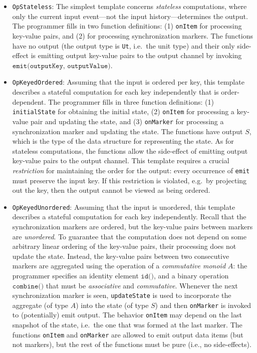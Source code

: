 \begin{itemize}
\item \texttt{OpStateless}:
The simplest template concerns \emph{stateless} computations, where only the current input event---not the input history---determines the output. The programmer fills in two function definitions: (1) \texttt{onItem} for processing key-value pairs, and (2)  for processing synchronization markers. The functions have no output (the output type is \texttt{Ut}, i.e.\ the unit type) and their only side-effect is emitting output key-value pairs to the output channel by invoking $\texttt{emit(outputKey, outputValue)}$.

\item \texttt{OpKeyedOrdered}:
Assuming that the input is ordered per key, this template describes a stateful computation for each key independently that is order-dependent. The programmer fills in three function definitions: (1) \texttt{initialState} for obtaining the initial state, (2) \texttt{onItem} for processing a key-value pair and updating the state, and (3) \texttt{onMarker} for processing a synchronization marker and updating the state. The functions have output $S$, which is the type of the data structure for representing the state. As for stateless computations, the functions allow the side-effect of emitting output key-value pairs to the output channel. This template requires a crucial \emph{restriction} for maintaining the order for the output: every occurrence of \texttt{emit} must preserve the input key. If this restriction is violated, e.g.\ by projecting out the key, then the output cannot be viewed as being ordered.

\item \texttt{OpKeyedUnordered}:
Assuming that the input is unordered, this template describes a stateful computation for each key independently. Recall that the synchronization markers are ordered, but the key-value pairs between markers are \emph{unordered}. To guarantee that the computation does not depend on some arbitrary linear ordering of the key-value pairs, their processing does not update the state. Instead, the key-value pairs between two consecutive markers are aggregated using the operation of a \emph{commutative monoid} $A$: the programmer specifies an identity element $\texttt{id()}$, and a binary operation $\texttt{combine()}$ that must be \emph{associative} and \emph{commutative}. Whenever the next synchronization marker is seen, \texttt{updateState} is used to incorporate the aggregate (of type $A$) into the state (of type $S$) and then \texttt{onMarker} is invoked to (potentially) emit output. The behavior \texttt{onItem} may depend on the last snapshot of the state, i.e.\ the one that was formed at the last marker. The functions \texttt{onItem} and \texttt{onMarker} are allowed to emit output data items (but not markers), but the rest of the functions must be pure (i.e., no side-effects).
\end{itemize}

